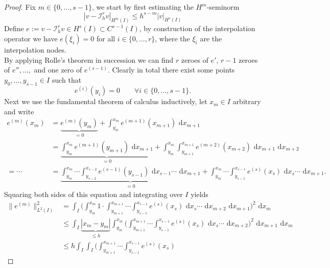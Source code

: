 \begin{proof}

		Fix $m \in \{0,\ldots,s-1\}$, we start by first estimating the $H^m$-seminorm
		\begin{equation}
			\label{eq:proof_polynomial_interpolation_approx_estimate_seminorm}
			| v - \mathcal{I}_h^r v |_{H^m(I)} \leq h^{s-m} |v|_{H^s(I)}
		\end{equation} 
		Define $e := v - \mathcal{I}_h^r v \in H^s(I) \subset C^{s-1}(I)$, by construction of the interpolation operator we have $e(\xi_i) = 0$ for 
		all $i \in \{0,\ldots,r\}$, where the $\xi_i$ are the interpolation nodes. \\
		By applying Rolle's theorem in succession we can find $r$ zeroes of $e'$, $r-1$ zeroes of $e''$$,\ldots,$ and one zero of $e^{(s-1)}$.
		Clearly in total there exist some points $y_0,\ldots,y_{s-1} \in I$ such that 
		\begin{equation*}
			e^{(i)}(y_i) = 0 \qquad \forall i \in \{0,\ldots,s-1\}.
		\end{equation*} 
		Next we use the fundamental theorem of calculus inductively, let $x_m \in I$ arbitrary and write
		\begin{align*}
			e^{(m)}(x_m) &= \underbrace{e^{(m)}(y_m)}_{=0} + \int_{y_m}^{x_m} e^{(m+1)}(x_{m+1}) \text{ d}x_{m+1} \\
			&= \underbrace{\int_{y_m}^{x_m} e^{(m+1)}(y_{m+1}) \text{ d}x_{m+1}}_{=0} 
			+\int_{y_m}^{x_m} \int_{y_{m+1}}^{x_{m+1}} e^{(m+2)}(x_{m+2}) \text{ d}x_{m+1} \text{ d}x_{m+2} \\
			= \cdots &= \underbrace{\int_{y_m}^{x_m}\cdots \int_{y_{s-2}}^{x_{s-2}} e^{(s-1)}(y_{s-1}) \text{ d}x_{s-1} \cdots \text{ d}x_{m+1}}_{=0}
			+ \int_{y_m}^{x_m}\cdots \int_{y_{s-1}}^{x_{s-1}} e^{(s)}(x_{s}) \text{ d}x_{s} \cdots \text{ d}x_{m+1}.
		\end{align*}
		Squaring both sides of this equation and integrating over $I$ yields
		\begin{align*}
			\| e^{(m)} \|_{L^2(I)}^2 &= 
			\int_{I} \Big(\int_{y_m}^{x_m}1 \cdot \int_{y_{m+1}}^{x_{m+1}}\cdots \int_{y_{s-1}}^{x_{s-1}} e^{(s)}(x_{s}) 
			\text{ d}x_{s} \cdots \text{ d}x_{m+2} \text{ d}x_{m+1}\Big)^2 \text{ d}x_{m} \\
			& \leq \int_{I} \underbrace{|x_{m} - y_{m} |}_{\leq h} \int_{y_m}^{x_m} \Big(\int_{y_{m+1}}^{x_{m+1}}\cdots \int_{y_{s-1}}^{x_{s-1}} e^{(s)}(x_{s}) 
			\text{ d}x_{s} \cdots \text{ d}x_{m+2} \Big)^2 \text{ d}x_{m+1} \text{ d}x_{m} \\
			& \leq h \int_{I}  \int_{I} \Big(\int_{y_{m+1}}^{x_{m+1}}\cdots \int_{y_{s-1}}^{x_{s-1}} e^{(s)}(x_{s}) 

\end{align*}$$
\end{proof}
